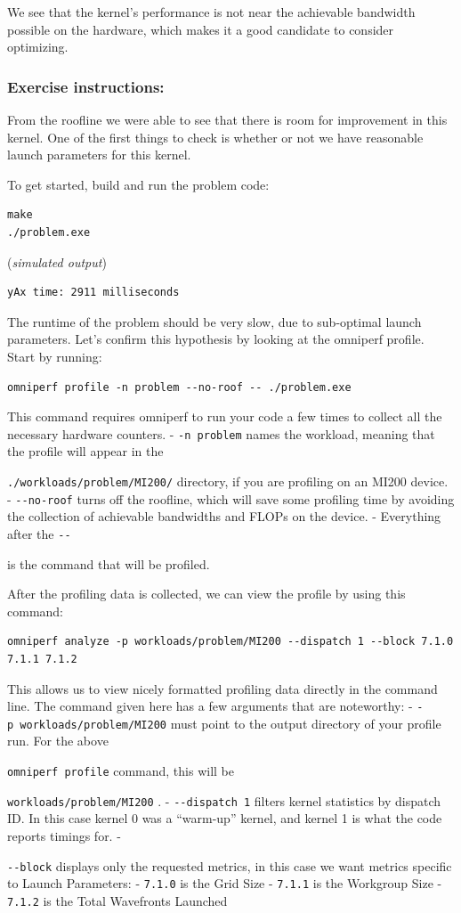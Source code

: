 \documentclass[
]{article}
\let\oldtexttt\texttt
\renewcommand{\texttt}[1]{
  \colorbox{Light}{\oldtexttt{#1}}
}
\begin{document}
We see that the kernel's performance is not near the achievable
bandwidth possible on the hardware, which makes it a good candidate to
consider optimizing.

\hypertarget{exercise-instructions}{%
\subsubsection{Exercise instructions:}\label{exercise-instructions}}

From the roofline we were able to see that there is room for improvement
in this kernel. One of the first things to check is whether or not we
have reasonable launch parameters for this kernel.

To get started, build and run the problem code:

\begin{Verbatim}
make
./problem.exe
\end{Verbatim}

(\emph{simulated output})

\begin{Verbatim}
yAx time: 2911 milliseconds
\end{Verbatim}

The runtime of the problem should be very slow, due to sub-optimal
launch parameters. Let's confirm this hypothesis by looking at the
omniperf profile. Start by running:

\begin{Verbatim}
omniperf profile -n problem --no-roof -- ./problem.exe
\end{Verbatim}

This command requires omniperf to run your code a few times to collect
all the necessary hardware counters. - \texttt{-n\ problem} names the
workload, meaning that the profile will appear in the
\texttt{./workloads/problem/MI200/} directory, if you are profiling on
an MI200 device. - \texttt{-\/-no-roof} turns off the roofline, which
will save some profiling time by avoiding the collection of achievable
bandwidths and FLOPs on the device. - Everything after the \texttt{-\/-}
is the command that will be profiled.

After the profiling data is collected, we can view the profile by using
this command:

\begin{Verbatim}
omniperf analyze -p workloads/problem/MI200 --dispatch 1 --block 7.1.0 7.1.1 7.1.2
\end{Verbatim}

This allows us to view nicely formatted profiling data directly in the
command line. The command given here has a few arguments that are
noteworthy: - \texttt{-p\ workloads/problem/MI200} must point to the
output directory of your profile run. For the above
\texttt{omniperf\ profile} command, this will be
\texttt{workloads/problem/MI200}. - \texttt{-\/-dispatch\ 1} filters
kernel statistics by dispatch ID. In this case kernel 0 was a
``warm-up'' kernel, and kernel 1 is what the code reports timings for. -
\texttt{-\/-block} displays only the requested metrics, in this case we
want metrics specific to Launch Parameters: - \texttt{7.1.0} is the Grid
Size - \texttt{7.1.1} is the Workgroup Size - \texttt{7.1.2} is the
Total Wavefronts Launched
\end{document}
